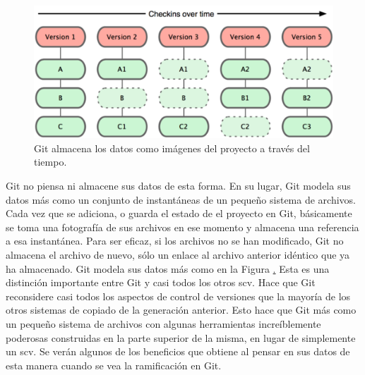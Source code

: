 \documentclass[12pt, spanish, oneside, onecolumn, a4paper]{report}
\begin{document}
\begin{figure} 
  \begin{center} 
    \includegraphics[width=.6\textwidth,keepaspectratio=true]{18333fig0105-tn.png} 
  \end{center} 
  \caption{Git almacena los datos como imágenes del proyecto a través del tiempo.} 
  \label{gitsnapshot} 
\end{figure}

Git no piensa ni almacene sus datos de esta forma. En su lugar, Git modela sus datos más como un conjunto de instantáneas de un pequeño sistema de archivos. Cada vez que se adiciona, o guarda el estado de el proyecto en Git, básicamente se toma una fotografía de sus archivos en ese momento y almacena una referencia a esa instantánea. Para ser eficaz, si los archivos no se han modificado, Git no almacena el archivo de nuevo, sólo un enlace al archivo anterior idéntico que ya ha almacenado. Git modela sus datos más como en la Figura 
\href{gitsnapshot}. Esta es una distinción importante entre Git y casi todos los otros 
\gls{scv}. Hace que Git reconsidere casi todos los aspectos de control de versiones que la mayoría de los otros sistemas de copiado de la generación anterior. Esto hace que Git más como un pequeño sistema de archivos con algunas herramientas increíblemente poderosas construidas en la parte superior de la misma, en lugar de simplemente un 
\gls{scv}. Se verán algunos de los beneficios que obtiene al pensar en sus datos de esta manera cuando se vea la ramificación en Git. 
\end{document}
